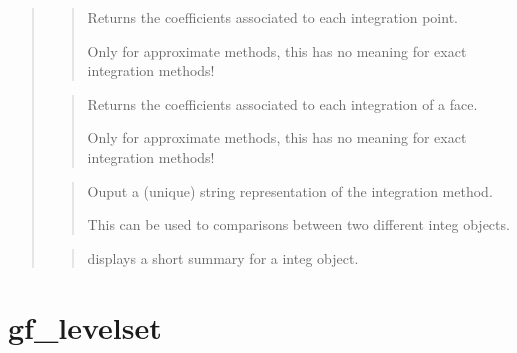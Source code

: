 \documentclass[a4paper,11pt,english]{sphinxmanual}
\begin{document}
\begin{quote}
\sphinxAtStartPar
{}
\begin{quote}

\sphinxAtStartPar
Returns the coefficients associated to each integration point.

\sphinxAtStartPar
Only for approximate methods, this has no meaning for exact
integration methods!
\end{quote}

\sphinxAtStartPar
{}
\begin{quote}

\sphinxAtStartPar
Returns the coefficients associated to each integration of a face.

\sphinxAtStartPar
Only for approximate methods, this has no meaning for exact
integration methods!
\end{quote}

\sphinxAtStartPar
{}
\begin{quote}

\sphinxAtStartPar
Ouput a (unique) string representation of the integration method.

\sphinxAtStartPar
This can be used to  comparisons between two different integ
objects.
\end{quote}

\sphinxAtStartPar
{}
\begin{quote}

\sphinxAtStartPar
displays a short summary for a integ object.
\end{quote}
\end{quote}


\section{gf\_levelset}
\label{\detokenize{scilab/cmdref_gf_levelset:gf-levelset}}\label{\detokenize{scilab/cmdref_gf_levelset::doc}}
\sphinxAtStartPar
{}

\begin{sphinxVerbatim}[commandchars=\\\{\}]
     \PYG{p}{[}    \PYG{p}{[}     \PYG{p}{]}\PYG{p}{]}
\end{sphinxVerbatim}
\end{document}
